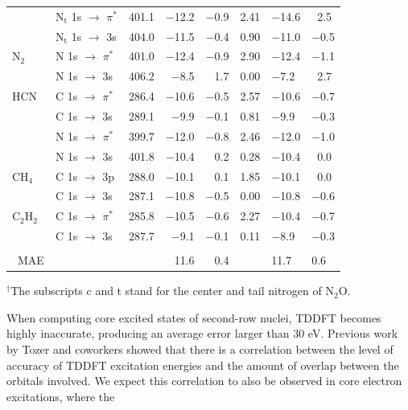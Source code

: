 \documentclass{article}
\begin{document}
\begin{table}[!ht]
\begin{tabular*}{12.5cm}{@{\extracolsep{\fill} }llcrrrHH}
    ~         & N$_\text{t}$ 1s $\rightarrow$ $\pi^*$ & 401.1 & $-$12.2     & $-$0.9 & 2.41 & $-$14.6    & \ 2.5   \\
    ~         & N$_\text{t}$ 1s $\rightarrow$ 3s      & 404.0   & $-$11.5    & $-$0.4 & 0.90   & $-$11.0    & $-$0.5  \\
    N$_2$         &N 1s  $\rightarrow$ $\pi^*$ & 401.0 & $-$12.4 & $-$0.9 & 2.90 & $-$12.4 & $-$1.1 \\
    ~         & N 1s  $\rightarrow$ 3s & 406.2 & $-$8.5 & 1.7 & 0.00  & $-$7.2 & \ 2.7\\ 
    HCN       & C 1s $\rightarrow$ $\pi^*$     & 286.4 & $-$10.6     & $-$0.5 & 2.57  & $-$10.6    & $-$0.7  \\
    ~         & C 1s $\rightarrow$ 3s          & 289.1 & $-$9.9      & $-$0.1 & 0.81   & $-$9.9    & $-$0.3  \\
    ~         & N 1s $\rightarrow$  $\pi^*$    & 399.7 & $-$12.0     & $-$0.8 & 2.46  & $-$12.0    & $-$1.0  \\
    ~         & N 1s $\rightarrow$ 3s          & 401.8 & $-$10.4      & \ 0.2 & 0.28    & $-$10.4    & \ 0.0  \\
    CH$_4$      & C 1s $\rightarrow$ 3p          & 288.0   & $-$10.1      & \ 0.1 & 1.85   & $-$10.1    & \ 0.0   \\
    ~         & C 1s $\rightarrow$ 3s          & 287.1 & $-$10.8    & $-$0.5 & 0.00   & $-$10.8     & $-$0.6 \\ 
        C$_2$H$_2$      & C 1s $\rightarrow$ $\pi^*$           & 285.8   & $-$10.5      & $-$0.6 & 2.27   & $-$10.4   & $-$0.7  \\
    ~         & C 1s $\rightarrow$ 3s            & 287.7 & $-$9.1 & $-$0.1 & 0.11   & $-$8.9    & $-$0.3\\\\
    ~MAE         &                            & ~     & 11.6      & 0.4 &   & 11.7     & 0.6 \\ 
    \hline
    \hline
    \end{tabular*}
    
    $^{\dagger}$The subscripts c and t stand for the center and tail nitrogen of N$_2$O.
    
     \label{table:FirstRow}
     \end{table}
When computing core excited states of second-row nuclei, TDDFT becomes highly inaccurate, producing an average error larger than 30 eV. Previous work by Tozer and coworkers \cite{peach_excitation_2008}  showed that there is a correlation between the level of accuracy of TDDFT excitation energies and the amount of overlap between the orbitals involved. We expect this correlation to also be observed in core electron excitations, where the
\end{document}

